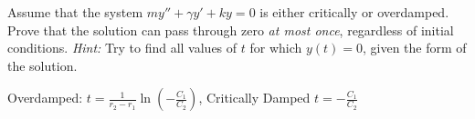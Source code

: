 \begin{exercise}
Assume that the system $my'' + \gamma y' + ky = 0$ is either critically or overdamped. Prove that the solution can pass through zero \emph{at most once}, regardless of initial conditions. \emph{Hint:} Try to find all values of $t$ for which $y(t) = 0$, given the form of the solution.
\end{exercise}
\comboSol{%
}
{%
Overdamped: $t = \frac{1}{r_2 - r_1}\ln\left(-\frac{C_1}{C_2}\right)$, Critically Damped $t = -\frac{C_1}{C_2}$
}

\setcounter{exercise}{100}



